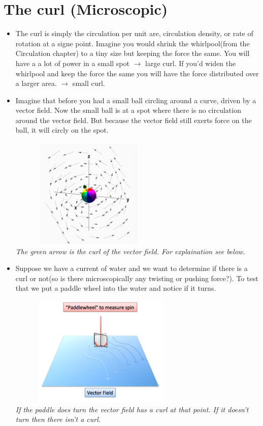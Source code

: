 \documentclass[12pt,a4paper]{article}
\begin{document}
	\newpage
	
	\section{The curl (Microscopic)}
	\begin{itemize}
		
		\item The curl is simply the circulation per unit are, circulation density, or rate of rotation at a signe point. Imagine you would shrink the whirlpool(from the Circulation chapter) to a tiny size but keeping the force the same. You will have a a lot of power in a small spot $\rightarrow$ large curl. If you'd widen the whirlpool and keep the force the same you will have the force distributed over a larger area. $\rightarrow$ small curl. 
		
		\item Imagine that before you had a small ball circling around a curve, driven by a vector field. Now the small ball is at a spot where there is no circulation around the vector field. But because the vector field still exerts force on the ball, it will circly on the spot. 
		
		\includegraphics[width=0.6\textwidth, height = 200px]{curl.png}\\
		\textit{The green arrow is the curl of the vector field. For explaination see below.}
		
		\item Suppose we have a current of water and we want to determine if there is a curl or not(so is there microscopically any twisting or pushing force?). To test that we put a paddle wheel into the water and notice if it turns. 
		
		\includegraphics[width=0.7\textwidth, height = 200px]{paddle_wheel.png}\\
		\textit{If the paddle does turn the vector field has a curl at
		 that point. If it doesn't turn then there isn't a curl.}
		

\end{itemize}
\end{document}
